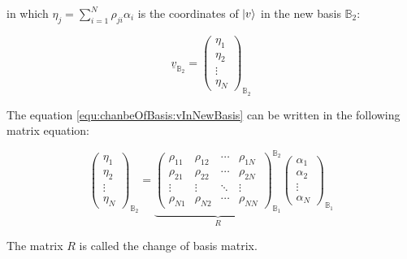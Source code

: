 in which $\eta_j = \sum_{i=1}^{N}\rho_{ji} \alpha_i $ is the coordinates of $ \ket{v} $ in the new basis $\mathbb{B}_2$:

\begin{equation*}
	\underline{v}_{\mathbb{B}_2} = \begin{pmatrix}
		\eta_1 \\
		\eta_2 \\
		\vdots \\
		\eta_N
	\end{pmatrix}_{\mathbb{B}_2}
\end{equation*}


The equation \ref{equ:chanbeOfBasis:vInNewBasis} can be written in the following matrix equation:

\begin{equation}
	\begin{pmatrix}
		\eta_1 \\
		\eta_2 \\
		\vdots \\
		\eta_N
	\end{pmatrix}_{\mathbb{B}_2} = 
	\underbrace{\begin{pmatrix}
			\rho_{11} & \rho_{12} & \cdots & \rho_{1N}\\
			\rho_{21} & \rho_{22} & \cdots & \rho_{2N}\\
			\vdots    & \vdots    & \ddots & \vdots\\
			\rho_{N1} & \rho_{N2} & \cdots & \rho_{NN} 
		\end{pmatrix}_{\mathbb{B}_1}^{\mathbb{B}_2}}_{R}
	\begin{pmatrix}
		\alpha_1 \\
		\alpha_2 \\
		\vdots \\
		\alpha_N
	\end{pmatrix}_{\mathbb{B}_1} 
\end{equation}

The matrix $R$ is called the change of basis matrix. \newline

